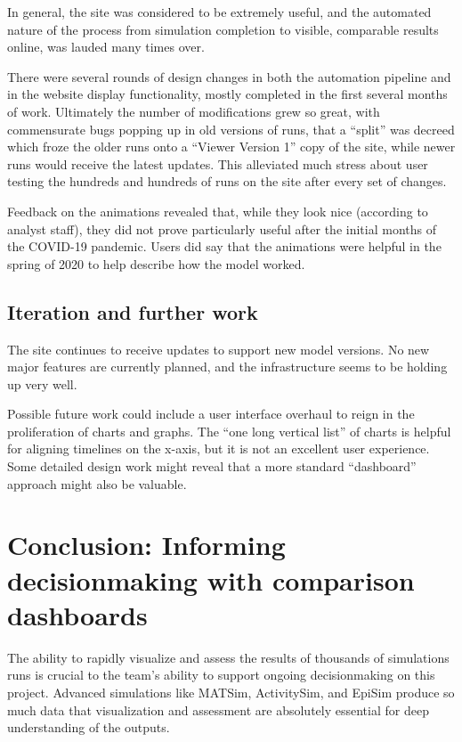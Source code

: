 In general, the site was considered to be extremely useful, and the automated nature of the process from simulation completion to visible, comparable results online, was lauded many times over.

There were several rounds of design changes in both the automation pipeline and in the website display functionality, mostly completed in the first several months of work. Ultimately the number of modifications grew so great, with commensurate bugs popping up in old versions of runs, that a ``split'' was decreed which froze the older runs onto a ``Viewer Version 1'' copy of the site, while newer runs would receive the latest updates. This alleviated much stress about user testing the hundreds and hundreds of runs on the site after every set of changes.

Feedback on the animations revealed that, while they look nice (according to analyst staff), they did not prove particularly useful after the initial months of the COVID-19 pandemic. Users did say that the animations were helpful in the spring of 2020 to help describe how the model worked.

\hypertarget{covid-iteration-and-further-work}{%
\subsection{Iteration and further work}\label{covid-iteration-and-further-work}}

The site continues to receive updates to support new model versions. No new major features are currently planned, and the infrastructure seems to be holding up very well.

Possible future work could include a user interface overhaul to reign in the proliferation of charts and graphs. The ``one long vertical list'' of charts is helpful for aligning timelines on the x-axis, but it is not an excellent user experience. Some detailed design work might reveal that a more standard ``dashboard'' approach might also be valuable.

\hypertarget{covid-informing-decisionmaking-with-comparison-dashboards}{%
\section{Conclusion: Informing decisionmaking with comparison dashboards}\label{covid-informing-decisionmaking}}

The ability to rapidly visualize and assess the results of thousands of simulations runs is crucial to the team's ability to support ongoing decisionmaking on this project. Advanced simulations like MATSim, ActivitySim, and EpiSim produce so much data that visualization and assessment are absolutely essential for deep understanding of the outputs.

